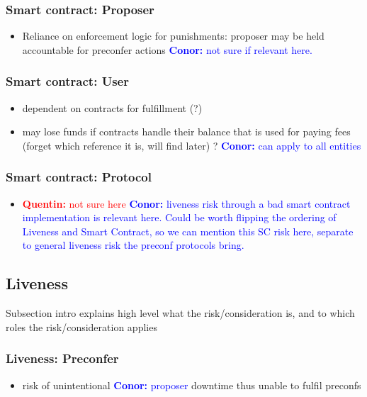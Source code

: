 \documentclass[a4paper]{article}
\theoremstyle{boldstyle}
\newcommand{\cm}[1]{\textcolor{blue}{\textbf{Conor:} #1}}
\newcommand{\qb}[1]{\textcolor{red}{\textbf{Quentin:} #1}}
\begin{document}
    \subsubsection{Smart contract: Proposer}
        \begin{itemize}
            \item Reliance on enforcement logic for punishments: proposer may be held accountable for preconfer actions \cm{not sure if relevant here. }
        \end{itemize}
    
    \subsubsection{Smart contract: User}
        \begin{itemize}
            \item dependent on contracts for fulfillment (?)
            \item may lose funds if contracts handle their balance that is used for paying fees (forget which reference it is, will find later) ?  \cm{can apply to all entities}
        \end{itemize}
    
    \subsubsection{Smart contract: Protocol}
        \begin{itemize}
            \item \qb{not sure here} \cm{liveness risk through a bad smart contract implementation is relevant here. Could be worth flipping the ordering of Liveness and Smart Contract, so we can mention this SC risk here, separate to general liveness risk the preconf protocols bring.}
        \end{itemize}
    
\subsection{Liveness}
    Subsection intro explains high level what the risk/consideration is, and to which roles the risk/consideration applies

    \subsubsection{Liveness: Preconfer}
        \begin{itemize}
            \item risk of unintentional \cm{proposer} downtime thus unable to fulfil preconfs
        \end{itemize}
    
\end{document}
